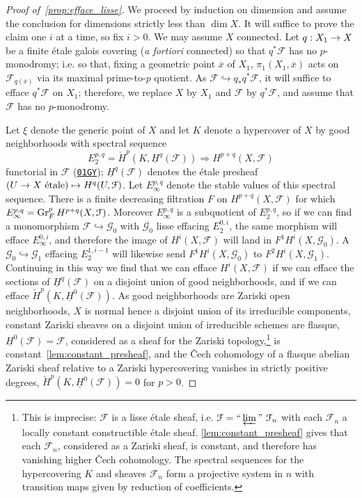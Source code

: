 \documentclass[deligne.tex]{subfiles}
\begin{document}
\begin{proof}[Proof of~\eqref{prop:efface_lisse}]
We proceed by induction on dimension and assume the conclusion for 
dimensions strictly less than $\dim X$.
It will suffice to prove the claim one $i$ at a time, so fix $i>0$.
We may assume $X$ connected.
Let $q:X_1\rightarrow X$ be a finite étale galois covering (\emph{a fortiori} 
connected) so that $q^*\mathcal F$ has no
$p$-monodromy; i.e. so that, fixing a geometric point $\overline x$ of 
$X_1$, $\pi_1(X_1,\overline x)$ acts on $\mathcal F_{q(\overline x)}$ via
its maximal prime-to-$p$ quotient.
As $\mathcal F\hookrightarrow q_*q^*\mathcal F$, it will 
suffice to efface $q^*\mathcal F$ on $X_1$; therefore, we replace $X$ by 
$X_1$ and $\mathcal F$ by $q^*\mathcal F$, and assume that
$\mathcal F$ has no $p$-monodromy.

Let $\xi$ denote the generic point of $X$ and let $K$ denote a hypercover of 
$X$ by good neighborhoods with spectral
sequence
\begin{equation*}
	E_2^{p,q}=\check H^p(K,\underline H^q(\mathcal F))\Rightarrow H^{p+q}(X,\mathcal F)
\end{equation*}
functorial in $\mathcal F$
(\href{https://stacks.math.columbia.edu/tag/01GY}{\texttt{01GY}});
$\underline H^q(\mathcal F)$ denotes the étale presheaf
$(U\rightarrow X\text{ étale})\mapsto H^q(U,\mathcal F)$.
Let $E_\infty^{p,q}$ denote the stable values of this spectral sequence.
There is a finite decreasing filtration $F$ on $H^{p+q}(X,\mathcal F)$
for which $E_\infty^{p,q}=\operatorname{Gr}_F^pH^{p+q}(X,\mathcal F)$.
Moreover $E_\infty^{p,q}$ is a subquotient of $E_2^{p,q}$, so if we can find
a monomorphism $\mathcal F\hookrightarrow\mathcal G_0$ with $\mathcal G_0$ 
lisse effacing $E_2^{0,i}$, the same morphism will efface $E_\infty^{0,i}$,
and therefore the image of $H^i(X,\mathcal F)$ will land in
$F^1H^i(X,\mathcal G_0)$. A $\mathcal G_0\hookrightarrow\mathcal G_1$
effacing $E_2^{1,i-1}$ will likewise send $F^1H^i(X,\mathcal G_0)$ to
$F^2H^i(X,\mathcal G_1)$. Continuing in this way we find that we can efface
$H^i(X,\mathcal F)$ if we can efface the sections of
$\underline H^q(\mathcal F)$ on a disjoint union of good neighborhoods, and
if we can efface $\check H^p(K,\underline H^0(\mathcal F))$.
As good neighborhoods are Zariski open neighborhoods, $X$ is normal 
hence a disjoint union of its irreducible components, constant Zariski
sheaves on a disjoint union of irreducible schemes are flasque, 
$\underline H^0(\mathcal F)=\mathcal F$, considered as a sheaf for the
Zariski topology,\footnote{This is imprecise: $\mathcal F$ is a lisse étale
sheaf, i.e. $\mathcal F=``\varprojlim"\ \mathcal F_n$ with each
$\mathcal F_n$ a locally constant constructible étale sheaf.
\eqref{lem:constant_presheaf} gives that each $\mathcal F_n$, considered as
a Zariski sheaf, is constant, and therefore has vanishing higher \v Cech
cohomology. The spectral sequences for the hypercovering $K$ and sheaves 
$\mathcal F_n$ form a projective system in $n$ with transition maps given by 
reduction of coefficients.} is constant~\eqref{lem:constant_presheaf}, and 
the \v Cech cohomology of a flasque abelian Zariski sheaf relative to a 
Zariski hypercovering vanishes in strictly positive degrees,
$\check H^p(K,\underline H^0(\mathcal F))=0$ for $p>0$.


\end{proof}
\end{document}

